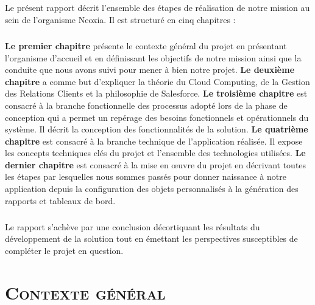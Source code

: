 \documentclass[a4paper, 12pt]{report}
\begin{document}
\begin{flushleft}
 \paragraph{}
Le présent rapport décrit l'ensemble des étapes de réalisation de notre mission au sein de l'organisme Neoxia. Il est structuré en cinq chapitres :
\paragraph{}
\textbf{Le premier chapitre} présente le contexte général du projet en présentant l'organisme d'accueil et en définissant les objectifs de notre mission ainsi que la conduite que nous avons suivi pour mener à bien notre projet.
\newline
\textbf{Le deuxième chapitre }a comme but d'expliquer la théorie du Cloud Computing, de la Gestion des Relations Clients et la philosophie de Salesforce.
\newline
\textbf{Le troisième chapitre} est consacré à la branche fonctionnelle des processus adopté lors de la phase de conception qui a permet un repérage des besoins fonctionnels et opérationnels du système. Il décrit la conception des fonctionnalités de la solution.
\newline
\textbf{Le quatrième chapitre} est consacré à la branche technique de l'application réalisée. Il expose les concepts techniques clés du projet et l'ensemble des technologies utilisées.
\newline
\textbf{Le dernier chapitre} est consacré à la mise en œuvre du projet en décrivant toutes les étapes par lesquelles nous sommes passés pour donner naissance à notre application depuis la configuration des objets personnalisés à la génération des rapports et tableaux de bord.

\paragraph{}
Le rapport s'achève par une conclusion décortiquant les résultats du développement de la solution tout en émettant les perspectives susceptibles de compléter le projet en question.
\end{flushleft}



\chapter{\textsc{Contexte général}}
\end{document}
